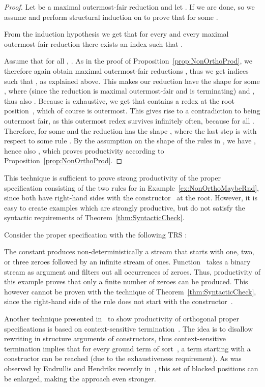 \documentclass{eptcs}
\begin{document}
\begin{proof}
Let  be a maximal outermost-fair
reduction and let .
If  we are done, so we assume  and
perform structural induction on  to prove that  for some
.

From the induction hypothesis we get that for every  and every
maximal outermost-fair reduction  there
exists an index  such that .

Assume that for all , .
As in the proof of Proposition~\ref{prop:NonOrthoProd}, we therefore again
obtain maximal outermost-fair reductions , thus we get indices
 such that , as explained above. This
makes our reduction  have the shape
 for some ,
where  (since the reduction  is
maximal outermost-fair and  is terminating) and
, thus also . Because  is
exhaustive, we get that  contains a redex at the root position~,
which of course is outermost. This gives rise to a contradiction to  being
outermost fair, as this outermost redex survives infinitely often, because
 for all . Therefore,  for some
 and the reduction has the shape , where the last step is with respect to some rule
.
By the assumption on the shape of the rules in , we have ,
hence also , which proves productivity according to
Proposition~\ref{prop:NonOrthoProd}.
\end{proof}

This technique is sufficient to prove strong productivity of the proper
specification consisting of the two rules for  in
Example~\ref{ex:NonOrthoMaybeRnd}, since both have right-hand sides with the
constructor~ at the root. However, it is easy to create examples which are
strongly productive, but do not satisfy the syntactic requirements of
Theorem~\ref{thm:SyntacticCheck}.

\begin{example}
\label{ex:NonSyntax}
Consider the proper specification with the following TRS :


The constant  produces non-deterministically a stream that
starts with one, two, or three zeroes followed by an infinite stream of ones.
Function~ takes a binary stream as argument and filters out all
occurrences of zeroes. Thus, productivity of this example proves that only a
finite number of zeroes can be produced. This however cannot be proven with the
technique of Theorem~\ref{thm:SyntacticCheck}, since the right-hand side of the
rule  does not start with the
constructor~.
\end{example}


Another technique presented in~\cite{ZR10} to show productivity of orthogonal
proper specifications is based on context-sensitive termination~\cite{L98}.
The idea is to disallow rewriting in structure arguments of constructors, thus
context-sensitive termination implies that for every ground term of sort~,
a term starting with a constructor can be reached (due to the exhaustiveness
requirement). As was observed by Endrullis and Hendriks recently in~\cite{EH11},
this set of blocked positions can be enlarged, making the approach even
stronger.
\end{document}
